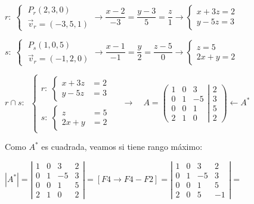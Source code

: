 $ r:\; \begin{cases} \; P_r(2,3,0) \\ \; \vec v_r=(-3,5,1) \end{cases} \to \dfrac{x-2}{-3}=\dfrac{y-3}{5}=\dfrac{z}{1} \to \begin{cases} x+3z=2\\y-5z=3 \end{cases} $

$s:\; \begin{cases} \; P_s(1,0,5) \\ \; \vec v_r=(-1,2,0) \end{cases} \to \dfrac{x-1}{-1}=\dfrac{y}{2}=\dfrac{z-5}{0} \to \begin{cases} z=5\\2x+y=2 \end{cases} $

$r\cap s:\;\;\begin{cases} r:\; \begin{cases} x+3z&=2\\y-5z&=3  \end{cases} \\ s:\; \begin{cases} z&=5\\2x+y&=2 \end{cases}   \end{cases} \quad \to 
\quad A=\left( \begin{matrix} 1&0&3\\0&1&-5\\0&0&1\\2&1&0 \end{matrix} \right. \left| \begin{matrix} 2\\3\\5\\2 \end{matrix} \right) \leftarrow A^*$


Como $A^*$ es cuadrada, veamos si tiene rango máximo:

$|A^*|= \left| \begin{matrix} 1&0&3&2\\0&1&-5&3\\0&0&1&5\\2&1&0&2  \end{matrix} \right|= [F4 \to F4-F2]=  \left| \begin{matrix} 1&0&3&2\\0&1&-5&3\\0&0&1&5\\2&0&5&-1  \end{matrix} \right|= $

